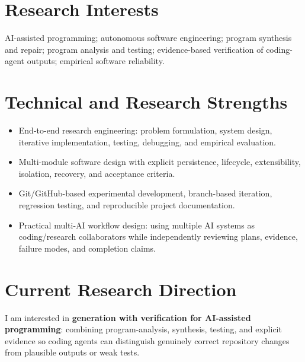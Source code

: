 \documentclass[10pt,a4paper]{article}
\begin{document}
\section{Research Interests}
AI-assisted programming; autonomous software engineering; program synthesis and repair; program analysis and testing; evidence-based verification of coding-agent outputs; empirical software reliability.

\section{Technical and Research Strengths}
\begin{itemize}
  \item End-to-end research engineering: problem formulation, system design, iterative implementation, testing, debugging, and empirical evaluation.
  \item Multi-module software design with explicit persistence, lifecycle, extensibility, isolation, recovery, and acceptance criteria.
  \item Git/GitHub-based experimental development, branch-based iteration, regression testing, and reproducible project documentation.
  \item Practical multi-AI workflow design: using multiple AI systems as coding/research collaborators while independently reviewing plans, evidence, failure modes, and completion claims.
\end{itemize}

\section{Current Research Direction}
I am interested in \textbf{generation with verification for AI-assisted programming}: combining program-analysis, synthesis, testing, and explicit evidence so coding agents can distinguish genuinely correct repository changes from plausible outputs or weak tests.
\end{document}
